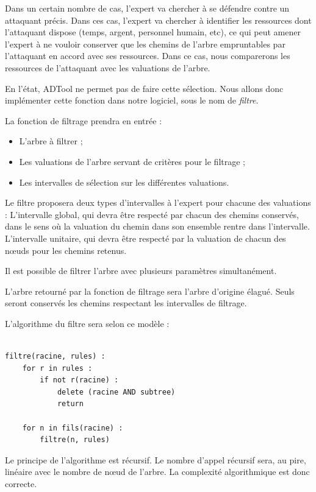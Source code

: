 		Dans un certain nombre de cas, l'expert va chercher à se défendre contre un attaquant précis. Dans ces cas, l'expert va chercher à identifier les ressources dont l'attaquant dispose (temps, argent, personnel humain, etc), ce qui peut amener l'expert à ne vouloir conserver que les chemins de l'arbre empruntables par l'attaquant en accord avec ses ressources. Dans ce cas, nous comparerons les ressources de l'attaquant avec les valuations de l'arbre.

		En l'état, ADTool ne permet pas de faire cette sélection. Nous allons donc implémenter cette fonction dans notre logiciel, sous le nom de \textit{filtre}.

		La fonction de filtrage prendra en entrée : 
		\begin{itemize}
		\item L'arbre à filtrer ;
		\item Les valuations de l'arbre servant de critères pour le filtrage ;
		\item Les intervalles de sélection sur les différentes valuations.
		\end{itemize}

		Le filtre proposera deux types d'intervalles à l'expert pour chacune des valuations :
		L'intervalle global, qui devra être respecté par chacun des chemins conservés, dans le sens où la valuation du chemin dans son ensemble rentre dans l'intervalle.
		L'intervalle unitaire, qui devra être respecté par la valuation de chacun des nœuds pour les chemins retenus.

		Il est possible de filtrer l'arbre avec plusieurs paramètres simultanément.
		
		L'arbre retourné par la fonction de filtrage sera l'arbre d'origine élagué. Seuls seront conservés les chemins respectant les intervalles de filtrage.
		
		L'algorithme du filtre sera selon ce modèle :

		\begin{lstlisting}

filtre(racine, rules) :
	for r in rules :
		if not r(racine) :
			delete (racine AND subtree)
			return

	for n in fils(racine) :
		filtre(n, rules)

\end{lstlisting}
	
		Le principe de l'algorithme est récursif.
		Le nombre d'appel récursif sera, au pire, linéaire avec le nombre de nœud de l'arbre.
		La complexité algorithmique est donc correcte.

